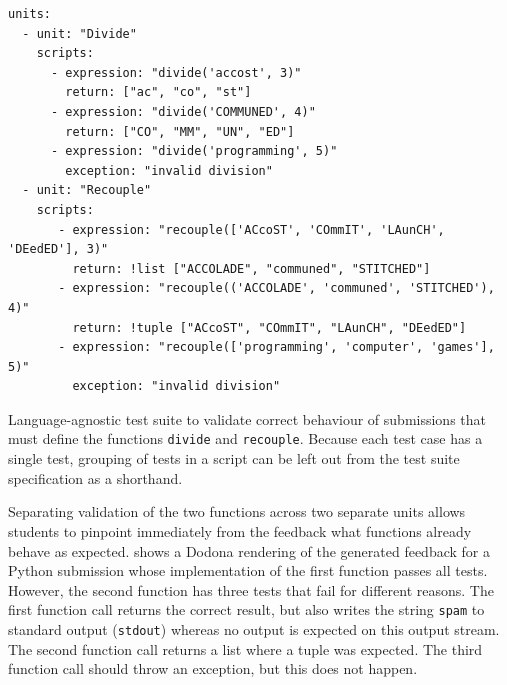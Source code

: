 \documentclass[../main]{subfiles}
\begin{document}
\begin{listing}
    \begin{verbatim}
units:
  - unit: "Divide"
    scripts:
      - expression: "divide('accost', 3)"
        return: ["ac", "co", "st"]
      - expression: "divide('COMMUNED', 4)"
        return: ["CO", "MM", "UN", "ED"]
      - expression: "divide('programming', 5)"
        exception: "invalid division"
  - unit: "Recouple"
    scripts:
       - expression: "recouple(['ACcoST', 'COmmIT', 'LAunCH', 'DEedED'], 3)"
         return: !list ["ACCOLADE", "communed", "STITCHED"]
       - expression: "recouple(('ACCOLADE', 'communed', 'STITCHED'), 4)"
         return: !tuple ["ACcoST", "COmmIT", "LAunCH", "DEedED"]
       - expression: "recouple(['programming', 'computer', 'games'], 5)"
         exception: "invalid division"
    \end{verbatim}
    \caption[]{
        Language-agnostic test suite to validate correct behaviour of submissions that must define the functions \texttt{divide} and \texttt{recouple}.
        Because each test case has a single test, grouping of tests in a script can be left out from the test suite specification as a shorthand.
    }
    \label{lst:recouple-example}
\end{listing}

Separating validation of the two functions across two separate units allows students to pinpoint immediately from the feedback what functions already behave as expected.
 shows a Dodona rendering of the generated feedback for a Python submission whose implementation of the first function passes all tests.
However, the second function has three tests that fail for different reasons.
The first function call returns the correct result, but also writes the string \texttt{spam} to standard output (\texttt{stdout}) whereas no output is expected on this output stream.
The second function call returns a list where a tuple was expected.
The third function call should throw an exception, but this does not happen.
\end{document}
